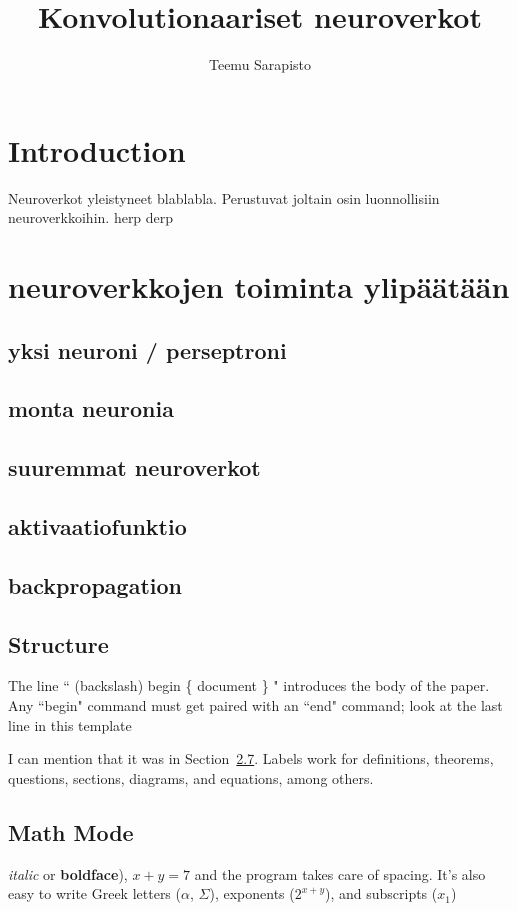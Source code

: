 \documentclass[11pt]{article}
\theoremstyle{plain}
\theoremstyle{definition}
\begin{document}
  \title{Konvolutionaariset neuroverkot}
  \author{Teemu Sarapisto}
  \maketitle

  \section{Introduction}


  Neuroverkot yleistyneet blablabla. Perustuvat joltain osin luonnollisiin neuroverkkoihin. herp \cite{Goodfellow-et-al-2016} derp


  \section{neuroverkkojen toiminta ylipäätään}
  \subsection{yksi neuroni / perseptroni}
  \subsection{monta neuronia}
  \subsection{suuremmat neuroverkot}
  \subsection{aktivaatiofunktio}
  \subsection{backpropagation}

  \subsection{Structure}
   The  line `` (backslash) begin \{ document \} "  introduces the body of the paper.  Any ``begin" command must get paired with an ``end" command; look at the last line in this template

   I can mention that it was in Section~\ref{section:mathmode}. Labels work for definitions, theorems, questions, sections, diagrams, and equations, among others.

  \subsection{Math Mode}\label{section:mathmode}
   \textit{italic} or \textbf{boldface}),  $x+ y=7$ and the program takes care of spacing.  It's also easy to write Greek letters ($\alpha$, $\Sigma$), exponents ($2^{x+y}$), and subscripts ($x_1$)



   
   

  
\end{document}
